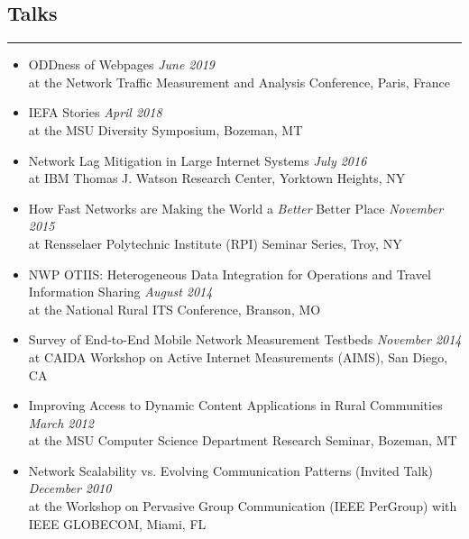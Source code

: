 \subsection*{Talks}
\hrule
\vspace{0.2cm}

\begin{itemize}

    \item ODDness of Webpages
    \hfill {\it June 2019}\\
    at the Network Traffic Measurement and Analysis Conference, Paris, France

    \item IEFA Stories
    \hfill {\it April 2018}\\
    at the MSU Diversity Symposium, Bozeman, MT

    \item Network Lag Mitigation in Large Internet Systems
    \hfill {\it July 2016}\\
    at IBM Thomas J. Watson Research Center, Yorktown Heights, NY

    \item How Fast Networks are Making the World a \textit{Better} Better Place
    \hfill {\it November 2015}\\
    at Rensselaer Polytechnic Institute (RPI) Seminar Series, Troy, NY

    \item NWP OTIIS: Heterogeneous Data Integration for Operations and Travel
    Information Sharing
    \hfill {\it August 2014}\\
    at the National Rural ITS Conference, Branson, MO

    \item Survey of End-to-End Mobile Network Measurement Testbeds
    \hfill {\it November 2014}\\
    at CAIDA Workshop on Active Internet Measurements (AIMS), San Diego, CA

    \item Improving Access to Dynamic Content Applications in Rural Communities
    \hfill {\it March 2012}\\
    at the MSU Computer Science Department Research Seminar, Bozeman, MT

    \item Network Scalability vs. Evolving Communication Patterns (Invited Talk)
    \hfill {\it December 2010}\\
    at the Workshop on Pervasive Group Communication (IEEE PerGroup) with IEEE
    GLOBECOM, Miami, FL


\end{itemize}
